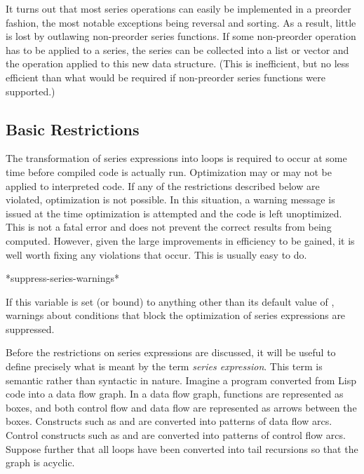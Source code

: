 It turns out that most series operations can easily be implemented in a
preorder fashion, the most notable exceptions being reversal and sorting.  As
a result, little is lost by outlawing non-preorder series functions.  If some
non-preorder operation has to be applied to a series, the series can be
collected into a list or vector and the operation applied to this new data
structure.  (This is inefficient, but no less efficient than what would be
required if non-preorder series functions were supported.)

\subsection{Basic Restrictions}

The transformation of series expressions into loops is required to occur at
some time before compiled code is actually run.  Optimization may or may
not be applied to interpreted code.  If any of the restrictions described
below are violated, optimization is not possible.  In this situation, a
warning message is issued at the time optimization is attempted and the
code is left unoptimized.  This is not a fatal error and does not prevent
the correct results from being computed.  However, given the large
improvements in efficiency to be gained, it is well worth fixing any
violations that occur.  This is usually easy to do.

\begin{defun}[Variable]
*suppress-series-warnings*

If this variable is set (or bound) to anything other than its default
value of , warnings about conditions that block the optimization
of series expressions are suppressed.
\end{defun}

Before the restrictions on series expressions are discussed, it will be useful to
define precisely what is meant by the term \emph{series expression}.  This
term is semantic rather than syntactic in nature. Imagine a program
converted from Lisp code into a data flow graph.  In a data flow graph,
functions are represented as boxes, and both control flow and data flow are
represented as arrows between the boxes.  Constructs such as  and
 are converted into patterns of data flow arcs.  Control
constructs such as  and  are converted into patterns of
control flow arcs.  Suppose further that all loops have been converted
into tail recursions so that the graph is acyclic.

